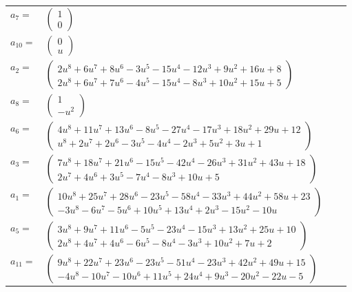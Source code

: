 \documentclass[1p]{elsarticle_modified}
\theoremstyle{definition}
\begin{document}
\begin{tabular}{m{7pt} m{180pt} m{7pt} m{180pt} }
\flushright $a_{7}=$&$\begin{pmatrix}1\\0\end{pmatrix}$ \\
\flushright $a_{10}=$&$\begin{pmatrix}0\\u\end{pmatrix}$ \\
\flushright $a_{2}=$&$\begin{pmatrix}2 u^8+6 u^7+8 u^6-3 u^5-15 u^4-12 u^3+9 u^2+16 u+8\\2 u^8+6 u^7+7 u^6-4 u^5-15 u^4-8 u^3+10 u^2+15 u+5\end{pmatrix}$ \\
\flushright $a_{8}=$&$\begin{pmatrix}1\\- u^2\end{pmatrix}$ \\
\flushright $a_{6}=$&$\begin{pmatrix}4 u^8+11 u^7+13 u^6-8 u^5-27 u^4-17 u^3+18 u^2+29 u+12\\u^8+2 u^7+2 u^6-3 u^5-4 u^4-2 u^3+5 u^2+3 u+1\end{pmatrix}$ \\
\flushright $a_{3}=$&$\begin{pmatrix}7 u^8+18 u^7+21 u^6-15 u^5-42 u^4-26 u^3+31 u^2+43 u+18\\2 u^7+4 u^6+3 u^5-7 u^4-8 u^3+10 u+5\end{pmatrix}$ \\
\flushright $a_{1}=$&$\begin{pmatrix}10 u^8+25 u^7+28 u^6-23 u^5-58 u^4-33 u^3+44 u^2+58 u+23\\-3 u^8-6 u^7-5 u^6+10 u^5+13 u^4+2 u^3-15 u^2-10 u\end{pmatrix}$ \\
\flushright $a_{5}=$&$\begin{pmatrix}3 u^8+9 u^7+11 u^6-5 u^5-23 u^4-15 u^3+13 u^2+25 u+10\\2 u^8+4 u^7+4 u^6-6 u^5-8 u^4-3 u^3+10 u^2+7 u+2\end{pmatrix}$ \\
\flushright $a_{11}=$&$\begin{pmatrix}9 u^8+22 u^7+23 u^6-23 u^5-51 u^4-23 u^3+42 u^2+49 u+15\\-4 u^8-10 u^7-10 u^6+11 u^5+24 u^4+9 u^3-20 u^2-22 u-5\end{pmatrix}$ \\

\end{tabular}
\end{document}
